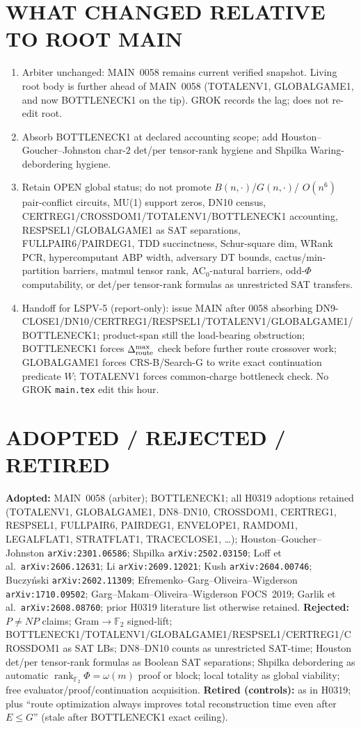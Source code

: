 \documentclass[11pt]{article}
\begin{document}
\section*{WHAT CHANGED RELATIVE TO ROOT MAIN}
\begin{enumerate}
\item Arbiter unchanged: MAIN~0058 remains current verified snapshot. Living
root body is further ahead of MAIN~0058 (TOTALENV1, GLOBALGAME1, and now
BOTTLENECK1 on the tip). GROK records the lag; does not re-edit root.
\item Absorb BOTTLENECK1 at declared accounting scope; add Houston--Goucher--Johnston
char-$2$ det/per tensor-rank hygiene and Shpilka Waring-debordering hygiene.
\item Retain OPEN global status; do not promote $B(n,\cdot)$/$G(n,\cdot)$/
$O(n^6)$ pair-conflict circuits, MU(1) support zeros, DN10 census,
CERTREG1/CROSSDOM1/TOTALENV1/BOTTLENECK1 accounting, RESPSEL1/GLOBALGAME1 as
SAT separations, FULLPAIR6/PAIRDEG1, TDD succinctness, Schur-square dim, WRank
PCR, hypercomputant ABP width, adversary DT bounds, cactus/min-partition
barriers, matmul tensor rank, AC$_0$-natural barriers, odd-$\Phi$ computability,
or det/per tensor-rank formulas as unrestricted SAT transfers.
\item Handoff for LSPV-5 (report-only): issue MAIN after 0058 absorbing
DN9-CLOSE1/DN10/CERTREG1/RESPSEL1/TOTALENV1/GLOBALGAME1/BOTTLENECK1; product-span
still the load-bearing obstruction; BOTTLENECK1 forces
$\Delta_{\rm route}^{\max}$ check before further route crossover work;
GLOBALGAME1 forces CRS-B/Search-G to write exact continuation predicate $W$;
TOTALENV1 forces common-charge bottleneck check. No GROK \texttt{main.tex}
edit this hour.
\end{enumerate}

\section*{ADOPTED / REJECTED / RETIRED}
\textbf{Adopted:} MAIN~0058 (arbiter); BOTTLENECK1; all H0319 adoptions retained
(TOTALENV1, GLOBALGAME1, DN8--DN10, CROSSDOM1, CERTREG1, RESPSEL1, FULLPAIR6,
PAIRDEG1, ENVELOPE1, RAMDOM1, LEGALFLAT1, STRATFLAT1, TRACECLOSE1, \ldots);
Houston--Goucher--Johnston \texttt{arXiv:2301.06586}; Shpilka
\texttt{arXiv:2502.03150}; Loff et al.\ \texttt{arXiv:2606.12631}; Li
\texttt{arXiv:2609.12021}; Kush \texttt{arXiv:2604.00746}; Buczy\'nski
\texttt{arXiv:2602.11309}; Efremenko--Garg--Oliveira--Wigderson
\texttt{arXiv:1710.09502}; Garg--Makam--Oliveira--Wigderson FOCS~2019; Garlik et al.\
\texttt{arXiv:2608.08760}; prior H0319 literature list otherwise retained.
\textbf{Rejected:} $P\neq NP$ claims; Gram$\to\mathbb F_2$ signed-lift;
BOTTLENECK1/TOTALENV1/GLOBALGAME1/RESPSEL1/CERTREG1/CROSSDOM1 as SAT LBs;
DN8--DN10 counts as unrestricted SAT-time; Houston det/per tensor-rank formulas
as Boolean SAT separations; Shpilka debordering as automatic
$\operatorname{rank}_{\mathbb F_2}\Phi=\omega(m)$ proof or block; local totality
as global viability; free evaluator/proof/continuation acquisition.
\textbf{Retired (controls):} as in H0319; plus ``route optimization always
improves total reconstruction time even after $E\le G$'' (stale after
BOTTLENECK1 exact ceiling).
\end{document}
